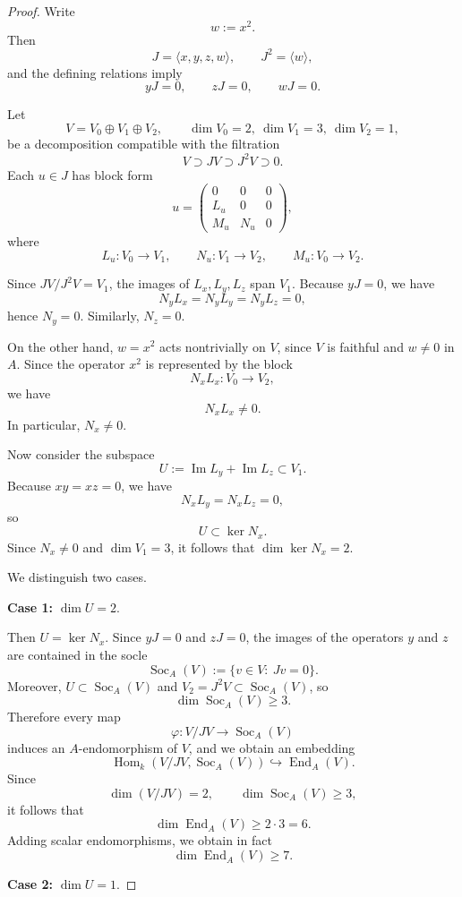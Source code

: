 \documentclass[10pt,a4paper]{amsart}
\DeclareMathOperator{\End}{End}
\DeclareMathOperator{\Hom}{Hom}
\DeclareMathOperator{\Soc}{Soc}
\begin{document}
\begin{proof}
	Write
	\[
	w:=x^2.
	\]
	Then
	\[
	J=\langle x,y,z,w\rangle,\qquad J^2=\langle w\rangle,
	\]
	and the defining relations imply
	\[
	yJ=0,\qquad zJ=0,\qquad wJ=0.
	\]
	
	Let
	\[
	V=V_0\oplus V_1\oplus V_2,
	\qquad \dim V_0=2,\ \dim V_1=3,\ \dim V_2=1,
	\]
	be a decomposition compatible with the filtration
	\[
	V\supset JV\supset J^2V\supset 0.
	\]
	Each $u\in J$ has block form
	\[
	u=
	\begin{pmatrix}
		0&0&0\\
		L_u&0&0\\
		M_u&N_u&0
	\end{pmatrix},
	\]
	where
	\[
	L_u:V_0\to V_1,\qquad N_u:V_1\to V_2,\qquad M_u:V_0\to V_2.
	\]
	
	Since $JV/J^2V=V_1$, the images of $L_x,L_y,L_z$ span $V_1$. Because $yJ=0$, we have
	\[
	N_yL_x=N_yL_y=N_yL_z=0,
	\]
	hence $N_y=0$. Similarly, $N_z=0$.
	
	On the other hand, $w=x^2$ acts nontrivially on $V$, since $V$ is faithful and $w\neq 0$ in $A$.
	Since the operator $x^2$ is represented by the block
	\[
	N_xL_x:V_0\to V_2,
	\]
	we have
	\[
	N_xL_x\neq 0.
	\]
	In particular, $N_x\neq 0$.
	
	Now consider the subspace
	\[
	U:=\operatorname{Im}L_y+\operatorname{Im}L_z \subset V_1.
	\]
	Because $xy=xz=0$, we have
	\[
	N_xL_y=N_xL_z=0,
	\]
	so
	\[
	U\subset \ker N_x.
	\]
	Since $N_x\neq 0$ and $\dim V_1=3$, it follows that $\dim\ker N_x=2$.
	
	We distinguish two cases.
	
	\medskip
	\noindent
	\textbf{Case 1:} $\dim U=2$.
	
	Then $U=\ker N_x$. Since $yJ=0$ and $zJ=0$, the images of the operators $y$ and $z$
	are contained in the socle
	\[
	\Soc_A(V):=\{v\in V:\ Jv=0\}.
	\]
	Moreover, $U\subset \Soc_A(V)$ and $V_2=J^2V\subset \Soc_A(V)$, so
	\[
	\dim \Soc_A(V)\ge 3.
	\]
	Therefore every map
	\[
	\varphi:V/JV\to \Soc_A(V)
	\]
	induces an $A$-endomorphism of $V$, and we obtain an embedding
	\[
	\Hom_k(V/JV,\Soc_A(V))\hookrightarrow \End_A(V).
	\]
	Since
	\[
	\dim(V/JV)=2,\qquad \dim\Soc_A(V)\ge 3,
	\]
	it follows that
	\[
	\dim\End_A(V)\ge 2\cdot 3=6.
	\]
	Adding scalar endomorphisms, we obtain in fact
	\[
	\dim\End_A(V)\ge 7.
	\]
	
	\medskip
	\noindent
	\textbf{Case 2:} $\dim U=1$.
	

\end{proof}
\end{document}
